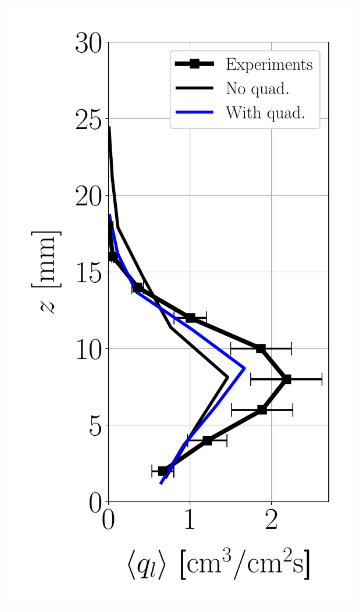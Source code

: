 \begin{figure}[h!]
\flushleft
\begin{subfigure}[b]{0.2\textwidth}
	\flushleft
   \includegraphics[scale=0.35]{./part2_developments/figures_ch6_lagrangian_JICF/params_quadtrees/profiles/flux_along_z}
\end{subfigure}
\hspace*{0.5in}
\begin{subfigure}[b]{0.2\textwidth}
	\flushleft

\end{subfigure}
\end{figure}
